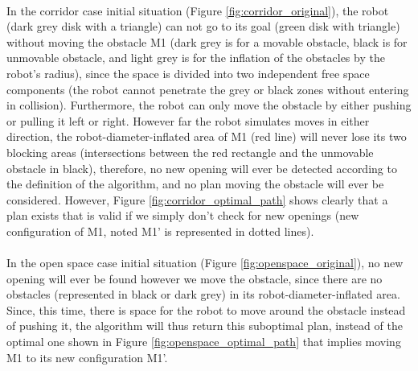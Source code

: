 \paragraph{}\label{figure_legends_paragraph} In the corridor case initial situation (Figure \ref{fig:corridor_original}), the robot (dark grey disk with a triangle) can not go to its goal (green disk with triangle) without moving the obstacle M1 (dark grey is for a movable obstacle, black is for unmovable obstacle, and light grey is for the inflation of the obstacles by the robot's radius), since the space is divided into two independent free space components (the robot cannot penetrate the grey or black zones without entering in collision). Furthermore, the robot can only move the obstacle by either pushing or pulling it left or right. However far the robot simulates moves in either direction, the robot-diameter-inflated area of M1 (red line) will never lose its two blocking areas (intersections between the red rectangle and the unmovable obstacle in black), therefore, no new opening will ever be detected according to the definition of the algorithm, and no plan moving the obstacle will ever be considered. However, Figure \ref{fig:corridor_optimal_path} shows clearly that a plan exists that is valid if we simply don't check for new openings (new configuration of M1, noted M1' is represented in dotted lines).

\paragraph{} In the open space case initial situation (Figure \ref{fig:openspace_original}), no new opening will ever be found however we move the obstacle, since there are no obstacles (represented in black or dark grey) in its robot-diameter-inflated area. Since, this time, there is space for the robot to move around the obstacle instead of pushing it, the algorithm will thus return this suboptimal plan, instead of the optimal one shown in Figure \ref{fig:openspace_optimal_path} that implies moving M1 to its new configuration M1'.

